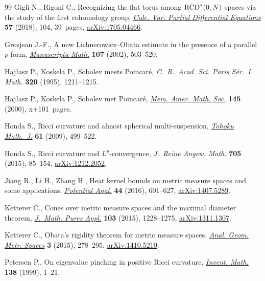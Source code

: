 \documentclass[pdftex]{sigma}
\numberwithin{equation}{section}
\theoremstyle{definition}
\begin{document}
\begin{thebibliography}{99}
Gigli N., Rigoni C., Recognizing the flat torus among {${\rm RCD}^*(0,N)$}
 spaces via the study of the first cohomology group, \href{https://doi.org/10.1007/s00526-018-1377-z}{\textit{Calc. Var.
 Partial Differential Equations}} \textbf{57} (2018), 104, 39~pages,
 \href{https://arxiv.org/abs/1705.04466}{arXiv:1705.04466}.

Grosjean J.-F., A new {L}ichnerowicz--{O}bata estimate in the presence of a
 parallel {$p$}-form, \href{https://doi.org/10.1007/s002290200248}{\textit{Manuscripta Math.}} \textbf{107} (2002),
 503--520.

Haj{\l}asz P., Koskela P., Sobolev meets {P}oincar\'e, \textit{C.~R.~Acad. Sci.
 Paris S\'er.~I Math.} \textbf{320} (1995), 1211--1215.

Haj{\l}asz P., Koskela P., Sobolev met {P}oincar\'e, \href{https://doi.org/10.1090/memo/0688}{\textit{Mem. Amer. Math.
 Soc.}} \textbf{145} (2000), x+101~pages.

Honda S., Ricci curvature and almost spherical multi-suspension, \href{https://doi.org/10.2748/tmj/1264084497}{\textit{Tohoku
 Math.~J.}} \textbf{61} (2009), 499--522.

Honda S., Ricci curvature and {$L^p$}-convergence, \textit{J.~Reine Angew.
 Math.} \textbf{705} (2015), 85--154, \href{https://arxiv.org/abs/1212.2052}{arXiv:1212.2052}.

Jiang R., Li H., Zhang H., Heat kernel bounds on metric measure spaces and some
 applications, \href{https://doi.org/10.1007/s11118-015-9521-2}{\textit{Potential Anal.}} \textbf{44} (2016), 601--627,
 \href{https://arxiv.org/abs/1407.5289}{arXiv:1407.5289}.

Ketterer C., Cones over metric measure spaces and the maximal diameter theorem,
 \href{https://doi.org/10.1016/j.matpur.2014.10.011}{\textit{J.~Math. Pures Appl.}} \textbf{103} (2015), 1228--1275,
 \href{https://arxiv.org/abs/1311.1307}{arXiv:1311.1307}.

Ketterer C., Obata's rigidity theorem for metric measure spaces, \href{https://doi.org/10.1515/agms-2015-0016}{\textit{Anal.
 Geom. Metr. Spaces}} \textbf{3} (2015), 278--295, \href{https://arxiv.org/abs/1410.5210}{arXiv:1410.5210}.

Petersen P., On eigenvalue pinching in positive {R}icci curvature,
 \href{https://doi.org/10.1007/s002220050339}{\textit{Invent. Math.}} \textbf{138} (1999), 1--21.


\end{thebibliography}
\end{document}
